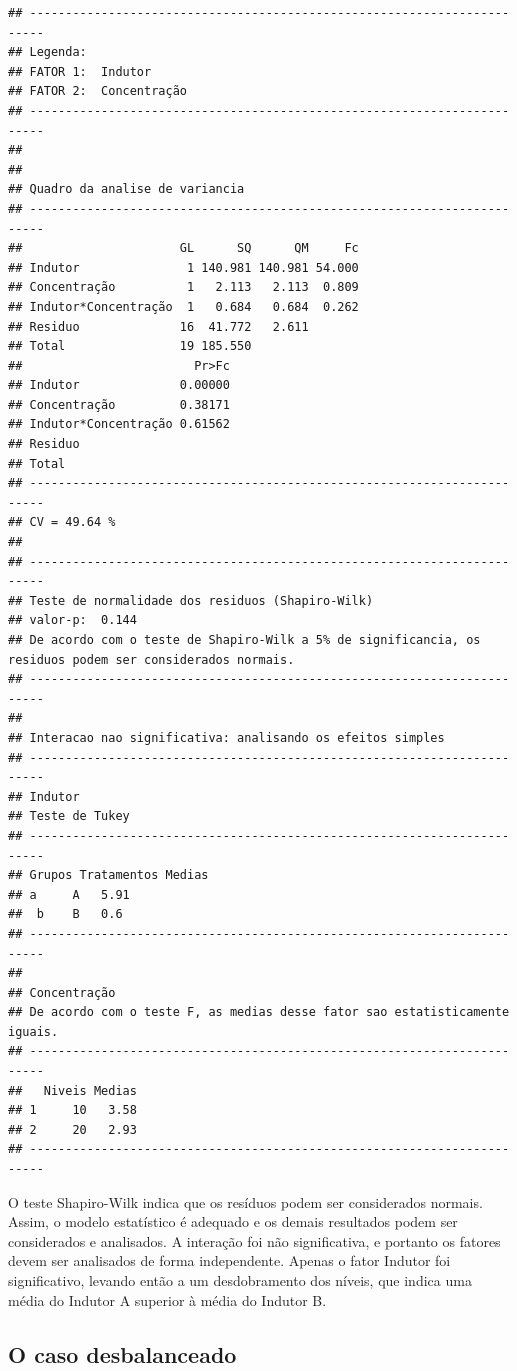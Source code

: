\documentclass[
]{article}
\begin{document}
\begin{verbatim}
## ------------------------------------------------------------------------
## Legenda:
## FATOR 1:  Indutor 
## FATOR 2:  Concentração 
## ------------------------------------------------------------------------
## 
## 
## Quadro da analise de variancia
## ------------------------------------------------------------------------
##                      GL      SQ      QM     Fc
## Indutor               1 140.981 140.981 54.000
## Concentração          1   2.113   2.113  0.809
## Indutor*Concentração  1   0.684   0.684  0.262
## Residuo              16  41.772   2.611       
## Total                19 185.550               
##                        Pr>Fc
## Indutor              0.00000
## Concentração         0.38171
## Indutor*Concentração 0.61562
## Residuo                     
## Total                       
## ------------------------------------------------------------------------
## CV = 49.64 %
## 
## ------------------------------------------------------------------------
## Teste de normalidade dos residuos (Shapiro-Wilk)
## valor-p:  0.144 
## De acordo com o teste de Shapiro-Wilk a 5% de significancia, os residuos podem ser considerados normais.
## ------------------------------------------------------------------------
## 
## Interacao nao significativa: analisando os efeitos simples
## ------------------------------------------------------------------------
## Indutor
## Teste de Tukey
## ------------------------------------------------------------------------
## Grupos Tratamentos Medias
## a     A   5.91 
##  b    B   0.6 
## ------------------------------------------------------------------------
## 
## Concentração
## De acordo com o teste F, as medias desse fator sao estatisticamente iguais.
## ------------------------------------------------------------------------
##   Niveis Medias
## 1     10   3.58
## 2     20   2.93
## ------------------------------------------------------------------------
\end{verbatim}

O teste Shapiro-Wilk indica que os resíduos podem ser considerados normais. Assim, o modelo estatístico é adequado e os demais resultados podem ser considerados e analisados. A interação foi não significativa, e portanto os fatores devem ser analisados de forma independente. Apenas o fator Indutor foi significativo, levando então a um desdobramento dos níveis, que indica uma média do Indutor A superior à média do Indutor B.

\hypertarget{o-caso-desbalanceado-2}{%
\subsection{O caso desbalanceado}\label{o-caso-desbalanceado-2}}
\end{document}

